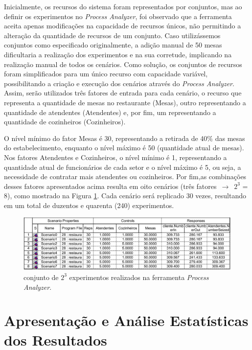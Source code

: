 \documentclass[pt,disc,oneside]{ufscpgeasthesis}
\begin{document}
			Inicialmente, os recursos do sistema foram representados por conjuntos, mas ao definir os experimentos no \textit{Process Analyzer}, foi observado que a ferramenta aceita apenas modificações na capacidade de recursos únicos, não permitindo a alteração da quantidade de recursos de um conjunto.
			Caso utilizássemos conjuntos como especificado originalmente, a adição manual de 50 mesas dificultaria a realização dos experimentos e na sua corretude, implicando na realização manual de todos os cenários.
			Como solução, os conjuntos de recursos foram simplificados para um único recurso com capacidade variável, possibilitando a criação e execução dos cenários através do \textit{Process Analyzer}.
			Assim, serão utilizados três fatores de entrada para cada cenário, o recurso que representa a quantidade de mesas no restaurante (Mesas), outro representando a quantidade de atendentes (Atendentes) e, por fim, um representando a quantidade de cozinheiros (Cozinheiros).

			O nível mínimo do fator Mesas é 30, representando a retirada de 40\% das mesas do estabelecimento, enquanto o nível máximo é 50 (quantidade atual de mesas).
			Nos fatores Atendentes e Cozinheiros, o nível mínimo é 1, representando a quantidade atual de funcionários de cada setor e o nível máximo é 5, ou seja, a necessidade de contratar mais atendentes ou cozinheiros.
			Por fim,as combinações desses fatores apresentados acima resulta em oito cenários (três fatores $\,\to\,$ $2^3$ = 8), como mostrado na Figura \ref{fig.experimentos}.
			Cada cenário será replicado 30 vezes, resultando em um total de duzentos e quarenta (240) experimentos.

			\begin{figure}[H]
				\begin{center}
					\includegraphics[width=.75\textwidth]{images/ProcessAnalyzer/grade.png}
					\caption{conjunto de $2^3$ experimentos realizados na ferramenta \textit{Process Analyzer}.}
					\label{fig.experimentos}
				\end{center}
			\end{figure}

		\section{Apresentação e Análise Estatísticas dos Resultados}
		\label{sec:apresentacao_analise}
\end{document}
